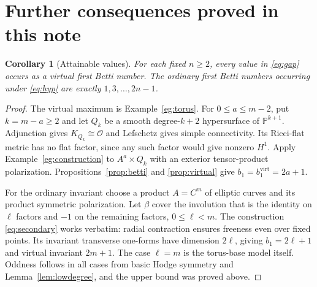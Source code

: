 \documentclass[12pt]{amsart}
\newtheorem{cor}[thm]{Corollary}
\theoremstyle{definition}
\theoremstyle{remark}
\numberwithin{equation}{section}
\newcommand{\cO}{\mathcal{O}}
\newcommand{\mP}{\mathbb{P}}
\newcommand{\virt}{\mathrm{virt}}
\begin{document}
\section{Further consequences proved in this note}\label{sec:extra}
\begin{cor}[Attainable values]\label{cor:values}
For each fixed $n\geq2$, every value in \eqref{eq:gap} occurs as a
virtual first Betti number. The ordinary first Betti numbers occurring
under \eqref{eq:hyp} are exactly $1,3,\ldots,2n-1$.
\end{cor}
\begin{proof}
The virtual maximum is Example~\ref{eg:torus}. For $0\leq a\leq m-2$,
put $k=m-a\geq2$ and let $Q_k$ be a smooth degree-$k+2$ hypersurface
of $\mP^{k+1}$. Adjunction gives $K_{Q_k}\cong\cO$ and Lefschetz
gives simple connectivity. Its Ricci-flat metric has no flat factor,
since any such factor would give nonzero $H^1$. Apply
Example~\ref{eg:construction} to $A^a\times Q_k$ with an exterior
tensor-product polarization. Propositions~\ref{prop:betti} and
\ref{prop:virtual} give $b_1=b_1^{\virt}=2a+1$.

For the ordinary invariant choose a product $A=C^m$ of elliptic
curves and its product symmetric polarization. Let $\beta$ cover the
involution that is the identity on $\ell$ factors and $-1$ on the
remaining factors, $0\leq\ell<m$. The construction
\eqref{eq:secondary} works verbatim: radial contraction ensures
freeness even over fixed points. Its invariant transverse one-forms
have dimension $2\ell$, giving $b_1=2\ell+1$ and virtual invariant
$2m+1$. The case $\ell=m$ is the torus-base model itself.
Oddness follows in all cases from basic Hodge symmetry and
Lemma~\ref{lem:lowdegree}, and the upper bound was proved above.
\end{proof}
\end{document}

